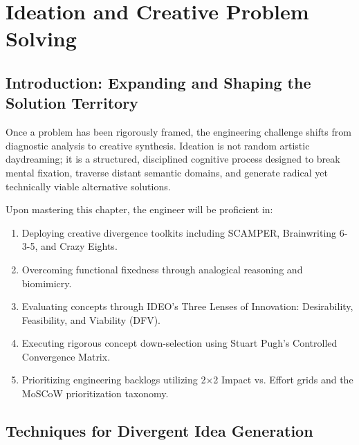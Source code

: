 \chapter{Ideation and Creative Problem Solving}
\label{chap:ideation}

\section{Introduction: Expanding and Shaping the Solution Territory}
Once a problem has been rigorously framed, the engineering challenge shifts from diagnostic analysis to creative synthesis. Ideation is not random artistic daydreaming; it is a structured, disciplined cognitive process designed to break mental fixation, traverse distant semantic domains, and generate radical yet technically viable alternative solutions.

\begin{important}
Upon mastering this chapter, the engineer will be proficient in:
\begin{enumerate}[leftmargin=1.5em]
    \item Deploying creative divergence toolkits including SCAMPER, Brainwriting 6-3-5, and Crazy Eights.
    \item Overcoming functional fixedness through analogical reasoning and biomimicry.
    \item Evaluating concepts through IDEO's Three Lenses of Innovation: Desirability, Feasibility, and Viability (DFV).
    \item Executing rigorous concept down-selection using Stuart Pugh's Controlled Convergence Matrix.
    \item Prioritizing engineering backlogs utilizing 2$\times$2 Impact vs. Effort grids and the MoSCoW prioritization taxonomy.
\end{enumerate}
\end{important}

\section{Techniques for Divergent Idea Generation}

